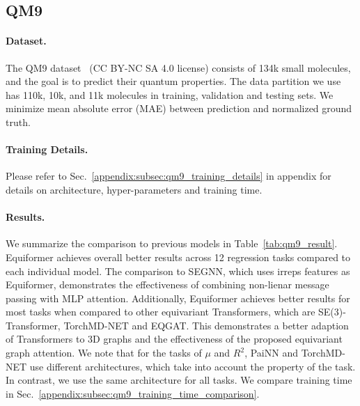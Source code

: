 \vspace{-3mm}
\subsection{QM9}
\vspace{-3mm}
\label{subsec:qm9_exp}

\paragraph{Dataset.}
The QM9 dataset~\citep{qm9_2, qm9_1}  (CC BY-NC SA 4.0 license) consists of 134k small molecules, and the goal is to predict their quantum properties.
The data partition we use has 110k, 10k, and 11k molecules in training, validation and testing sets.
We minimize mean absolute error (MAE) between prediction and normalized ground truth. %


\vspace{-3.25mm}
\paragraph{Training Details.}
Please refer to Sec.~\ref{appendix:subsec:qm9_training_details} in appendix for details on architecture, hyper-parameters and training time.


\vspace{-3.25mm}
\paragraph{Results.}
We summarize the comparison to previous models in Table~\ref{tab:qm9_result}.
Equiformer achieves overall better results across 12 regression tasks compared to each individual model.
The comparison to SEGNN, which uses irreps features as Equiformer, demonstrates the effectiveness of combining non-lienar message passing with MLP attention.
Additionally, Equiformer achieves better results for most tasks when compared to other equivariant Transformers, which are SE(3)-Transformer, TorchMD-NET and EQGAT.
This demonstrates a better adaption of Transformers to 3D graphs and the effectiveness of the proposed equivariant graph attention.
We note that for the tasks of $\mu$ and $R^2$, PaiNN and TorchMD-NET use different architectures, which take into account the property of the task.
In contrast, we use the same architecture for all tasks.
We compare training time in Sec.~\ref{appendix:subsec:qm9_training_time_comparison}.

